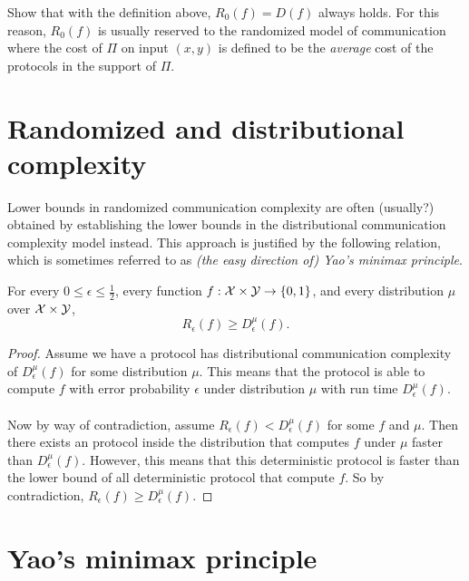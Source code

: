 \begin{exercise}
	Show that with the definition above, $R_0(f) = D(f)$ always holds. For this reason, $R_0(f)$ is usually reserved to the randomized model of communication where the cost of $\Pi$ on input $(x,y)$ is defined to be the \emph{average} cost of the protocols in the support of $\Pi$.
\end{exercise}



\section{Randomized and distributional complexity}

Lower bounds in randomized communication complexity are often (usually?) obtained by establishing the lower bounds in the distributional communication complexity model instead. This approach is justified by the following relation, which is sometimes referred to as \emph{(the easy direction of) Yao's minimax principle}.

\begin{theorem}
	For every $0 \le \epsilon \le \frac12$, every function $f : \mathcal{X} \times \mathcal{Y} \to \{0,1\}$, and every distribution $\mu$ over $\mathcal{X} \times \mathcal{Y}$,
	\[
	R_\epsilon(f) \ge D_\epsilon^\mu(f).
	\]
\end{theorem}

\begin{proof}
	Assume we have a protocol has distributional communication complexity of $D_\epsilon^\mu(f)$ for some distribution $\mu$. This means that the protocol is able to compute $f$ with error probability $\epsilon$ under distribution $\mu$ with run time $D_\epsilon^\mu(f)$. \\
	\\
	Now by way of contradiction, assume $R_\epsilon(f) < D_\epsilon^\mu(f)$ for some $f$ and $\mu$. Then there exists an protocol inside the distribution that computes $f$ under $\mu$ faster than $D_\epsilon^\mu(f)$. However, this means that this deterministic protocol is faster than the lower bound of all deterministic protocol that compute $f$. So by contradiction, $R_\epsilon(f) \ge D_\epsilon^\mu(f)$.
\end{proof}



\section{Yao's minimax principle}

